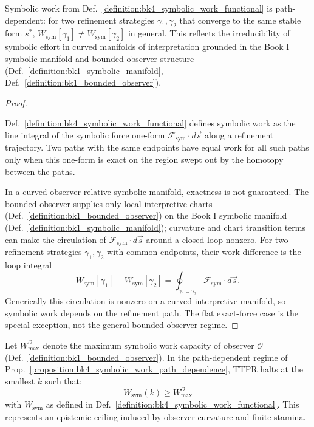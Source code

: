 \begin{proposition}
\label{proposition:bk4_symbolic_work_path_dependence}
Symbolic work from Def.~\ref{definition:bk4_symbolic_work_functional} is path-dependent: for two refinement strategies \( \gamma_1, \gamma_2 \) that converge to the same stable form \( s^* \), \( W_{\text{sym}}[\gamma_1] \neq W_{\text{sym}}[\gamma_2] \) in general. This reflects the irreducibility of symbolic effort in curved manifolds of interpretation grounded in the Book I symbolic manifold and bounded observer structure (Def.~\ref{definition:bk1_symbolic_manifold}, Def.~\ref{definition:bk1_bounded_observer}).
\end{proposition}

\begin{proof}
\label{proof:bk4_symbolic_work_path_dependence}
\leavevmode

Def.~\ref{definition:bk4_symbolic_work_functional} defines symbolic work as the
line integral of the symbolic force one-form
$\mathcal F_{\mathrm{sym}}\cdot d\vec{s}$ along a refinement trajectory. Two
paths with the same endpoints have equal work for all such paths only when this
one-form is exact on the region swept out by the homotopy between the paths.

In a curved observer-relative symbolic manifold, exactness is not guaranteed.
The bounded observer supplies only local interpretive charts
(Def.~\ref{definition:bk1_bounded_observer}) on the Book I symbolic manifold
(Def.~\ref{definition:bk1_symbolic_manifold}); curvature and chart transition
terms can make the circulation of
$\mathcal F_{\mathrm{sym}}\cdot d\vec{s}$ around a closed loop nonzero. For two
refinement strategies $\gamma_1,\gamma_2$ with common endpoints, their work
difference is the loop integral
\[
W_{\mathrm{sym}}[\gamma_1]-W_{\mathrm{sym}}[\gamma_2]
 = \oint_{\gamma_1\cup\overline{\gamma_2}}
   \mathcal F_{\mathrm{sym}}\cdot d\vec{s}.
\]
Generically this circulation is nonzero on a curved interpretive manifold, so
symbolic work depends on the refinement path. The flat exact-force case is the
special exception, not the general bounded-observer regime.
\end{proof}

\begin{remark}
\label{remark:bk4_symbolic_work_capacity}
Let \( W_{\max}^{\mathcal{O}} \) denote the maximum symbolic work capacity of observer \( \mathcal{O} \) (Def.~\ref{definition:bk1_bounded_observer}). In the path-dependent regime of Prop.~\ref{proposition:bk4_symbolic_work_path_dependence}, TTPR halts at the smallest \( k \) such that:
\[
W_{\text{sym}}(k) \geq W_{\max}^{\mathcal{O}}
\]
with \( W_{\text{sym}} \) as defined in Def.~\ref{definition:bk4_symbolic_work_functional}. This represents an epistemic ceiling induced by observer curvature and finite stamina.
\end{remark}


